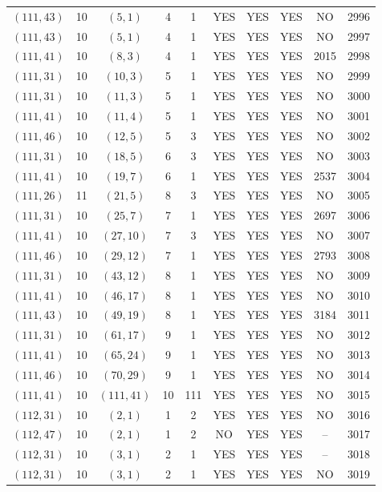 \begin{longtable}{|c|c|c|c|c|c|c|c|c|c|}
$(111, 43)$ & 10 & $(5, 1)$ & 4 & 1 & YES & YES & YES & NO & 2996\\
$(111, 43)$ & 10 & $(5, 1)$ & 4 & 1 & YES & YES & YES & NO & 2997\\
$(111, 41)$ & 10 & $(8, 3)$ & 4 & 1 & YES & YES & YES & 2015 & 2998\\
$(111, 31)$ & 10 & $(10, 3)$ & 5 & 1 & YES & YES & YES & NO & 2999\\
$(111, 31)$ & 10 & $(11, 3)$ & 5 & 1 & YES & YES & YES & NO & 3000\\
$(111, 41)$ & 10 & $(11, 4)$ & 5 & 1 & YES & YES & YES & NO & 3001\\
$(111, 46)$ & 10 & $(12, 5)$ & 5 & 3 & YES & YES & YES & NO & 3002\\
$(111, 31)$ & 10 & $(18, 5)$ & 6 & 3 & YES & YES & YES & NO & 3003\\
$(111, 41)$ & 10 & $(19, 7)$ & 6 & 1 & YES & YES & YES & 2537 & 3004\\
$(111, 26)$ & 11 & $(21, 5)$ & 8 & 3 & YES & YES & YES & NO & 3005\\
$(111, 31)$ & 10 & $(25, 7)$ & 7 & 1 & YES & YES & YES & 2697 & 3006\\
$(111, 41)$ & 10 & $(27, 10)$ & 7 & 3 & YES & YES & YES & NO & 3007\\
$(111, 46)$ & 10 & $(29, 12)$ & 7 & 1 & YES & YES & YES & 2793 & 3008\\
$(111, 31)$ & 10 & $(43, 12)$ & 8 & 1 & YES & YES & YES & NO & 3009\\
$(111, 41)$ & 10 & $(46, 17)$ & 8 & 1 & YES & YES & YES & NO & 3010\\
$(111, 43)$ & 10 & $(49, 19)$ & 8 & 1 & YES & YES & YES & 3184 & 3011\\
$(111, 31)$ & 10 & $(61, 17)$ & 9 & 1 & YES & YES & YES & NO & 3012\\
$(111, 41)$ & 10 & $(65, 24)$ & 9 & 1 & YES & YES & YES & NO & 3013\\
$(111, 46)$ & 10 & $(70, 29)$ & 9 & 1 & YES & YES & YES & NO & 3014\\
$(111, 41)$ & 10 & $(111, 41)$ & 10 & 111 & YES & YES & YES & NO & 3015\\
$(112, 31)$ & 10 & $(2, 1)$ & 1 & 2 & YES & YES & YES & NO & 3016\\
$(112, 47)$ & 10 & $(2, 1)$ & 1 & 2 & NO & YES & YES & -- & 3017\\
$(112, 31)$ & 10 & $(3, 1)$ & 2 & 1 & YES & YES & YES & -- & 3018\\
$(112, 31)$ & 10 & $(3, 1)$ & 2 & 1 & YES & YES & YES & NO & 3019\\

\end{longtable}
